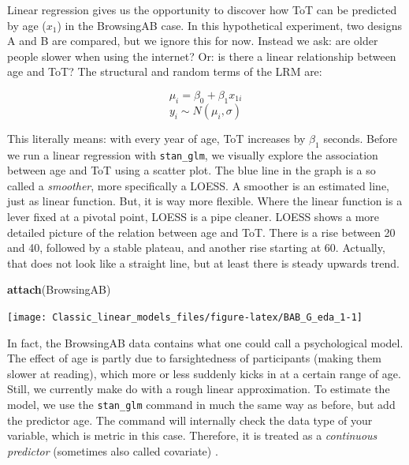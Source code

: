 \documentclass[]{svmono}
\newenvironment{Shaded}{\begin{snugshade}}{\end{snugshade}}
\newcommand{\KeywordTok}[1]{\textcolor[rgb]{0.13,0.29,0.53}{\textbf{#1}}}
\newcommand{\DataTypeTok}[1]{\textcolor[rgb]{0.13,0.29,0.53}{#1}}
\newcommand{\DecValTok}[1]{\textcolor[rgb]{0.00,0.00,0.81}{#1}}
\newcommand{\StringTok}[1]{\textcolor[rgb]{0.31,0.60,0.02}{#1}}
\newcommand{\OperatorTok}[1]{\textcolor[rgb]{0.81,0.36,0.00}{\textbf{#1}}}
\newcommand{\NormalTok}[1]{#1}
\begin{document}
Linear regression gives us the opportunity to discover how ToT can be
predicted by age (\(x_1\)) in the BrowsingAB case. In this hypothetical
experiment, two designs A and B are compared, but we ignore this for
now. Instead we ask: are older people slower when using the internet?
Or: is there a linear relationship between age and ToT? The structural
and random terms of the LRM are:

\[\mu_i = \beta_0 + \beta_1x_{1i}\] \[y_i \sim N(\mu_i, \sigma)\]

This literally means: with every year of age, ToT increases by
\(\beta_1\) seconds. Before we run a linear regression with
\texttt{stan\_glm}, we visually explore the association between age and
ToT using a scatter plot. The blue line in the graph is a so called a
\emph{smoother}, more specifically a LOESS. A smoother is an estimated
line, just as linear function. But, it is way more flexible. Where the
linear function is a lever fixed at a pivotal point, LOESS is a pipe
cleaner. LOESS shows a more detailed picture of the relation between age
and ToT. There is a rise between 20 and 40, followed by a stable
plateau, and another rise starting at 60. Actually, that does not look
like a straight line, but at least there is steady upwards trend.

\begin{Shaded}
\begin{Highlighting}[]
\KeywordTok{attach}\NormalTok{(BrowsingAB)}
\end{Highlighting}
\end{Shaded}

\begin{Shaded}
\end{Shaded}

\texttt{[image: Classic\_linear\_models\_files/figure-latex/BAB\_G\_eda\_1-1]}

In fact, the BrowsingAB data contains what one could call a
psychological model. The effect of age is partly due to farsightedness
of participants (making them slower at reading), which more or less
suddenly kicks in at a certain range of age. Still, we currently make do
with a rough linear approximation. To estimate the model, we use the
\texttt{stan\_glm} command in much the same way as before, but add the
predictor age. The command will internally check the data type of your
variable, which is metric in this case. Therefore, it is treated as a
\emph{continuous predictor} (sometimes also called covariate) .
\end{document}
